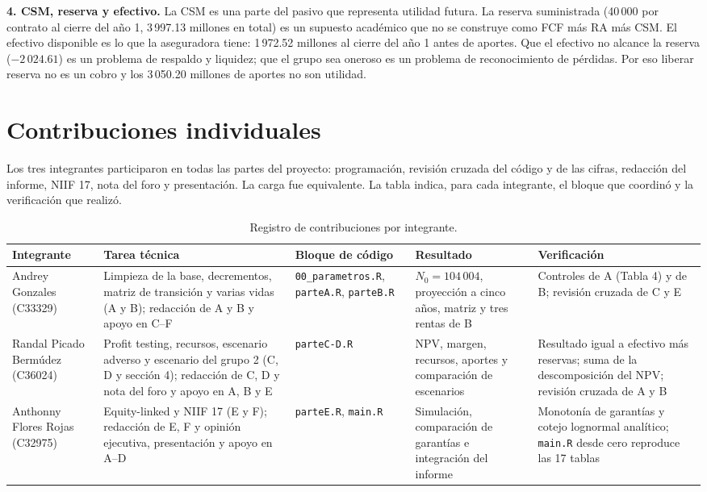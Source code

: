 \documentclass[10pt,a4paper]{article}
\numberwithin{equation}{section}
\begin{document}
	\textbf{4. CSM, reserva y efectivo.} La CSM es una parte del pasivo que representa utilidad futura. La reserva suministrada (40\,000 por contrato al cierre del año 1, 3\,997.13 millones en total) es un supuesto académico que no se construye como FCF más RA más CSM. El efectivo disponible es lo que la aseguradora tiene: 1\,972.52 millones al cierre del año 1 antes de aportes. Que el efectivo no alcance la reserva (\(-2\,024.61\)) es un problema de respaldo y liquidez; que el grupo sea oneroso es un problema de reconocimiento de pérdidas. Por eso liberar reserva no es un cobro y los 3\,050.20 millones de aportes no son utilidad.

	\clearpage
	\section*{Contribuciones individuales}\label{sec:contribuciones}

	Los tres integrantes participaron en todas las partes del proyecto: programación, revisión cruzada del código y de las cifras, redacción del informe, NIIF 17, nota del foro y presentación. La carga fue equivalente. La tabla indica, para cada integrante, el bloque que coordinó y la verificación que realizó.

	\begin{table}[htbp]
		\centering\small
		\renewcommand{\arraystretch}{1.3}
		\begin{tabularx}{\textwidth}{@{}>{\raggedright}p{3.2cm}>{\raggedright}X>{\raggedright}p{3.0cm}>{\raggedright}p{3.2cm}>{\raggedright\arraybackslash}X@{}}
			\toprule
			\textbf{Integrante} & \textbf{Tarea técnica} & \textbf{Bloque de código} & \textbf{Resultado} & \textbf{Verificación} \\
			\midrule
			Andrey Gonzales (C33329) & Limpieza de la base, decrementos, matriz de transición y varias vidas (A y B); redacción de A y B y apoyo en C--F & \texttt{00\_parametros.R}, \texttt{parteA.R}, \texttt{parteB.R} & \(N_0=104\,004\), proyección a cinco años, matriz y tres rentas de B & Controles de A (Tabla 4) y de B; revisión cruzada de C y E \\
			Randal Picado Bermúdez (C36024) & Profit testing, recursos, escenario adverso y escenario del grupo 2 (C, D y sección 4); redacción de C, D y nota del foro y apoyo en A, B y E & \texttt{parteC-D.R} & NPV, margen, recursos, aportes y comparación de escenarios & Resultado igual a efectivo más reservas; suma de la descomposición del NPV; revisión cruzada de A y B \\
			Anthonny Flores Rojas (C32975) & Equity-linked y NIIF 17 (E y F); redacción de E, F y opinión ejecutiva, presentación y apoyo en A--D & \texttt{parteE.R}, \texttt{main.R} & Simulación, comparación de garantías e integración del informe & Monotonía de garantías y cotejo lognormal analítico; \texttt{main.R} desde cero reproduce las 17 tablas \\
			\bottomrule
		\end{tabularx}
		\caption{Registro de contribuciones por integrante.}\label{tab:contrib}
	\end{table}
\end{document}
